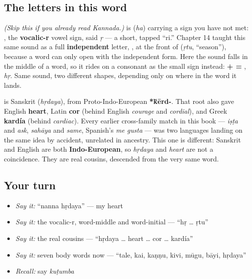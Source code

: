 \subsection*{The letters in this word}
\emph{(Skip this if you already read Kannada.)} \textbf{} is \textbf{} (\emph{ha}) carrying a sign you have not met: \textbf{}, the \textbf{vocalic-r} vowel sign, said \emph{ṛ} — a short, tapped \textquotedblleft{}ri.\textquotedblright{} Chapter 14 taught this same sound as a full \textbf{independent} letter, \textbf{}, at the front of \textbf{} (\emph{ṛtu}, \textquotedblleft{}season\textquotedblright{}), because a word can only open with the independent form. Here the sound falls in the middle of a word, so it rides on a consonant as the small sign \textbf{} instead: \textbf{ +  = }, \emph{hṛ}. Same sound, two different shapes, depending only on where in the word it lands.

\begin{cousinweb}
\textbf{} is Sanskrit \textbf{} (\emph{hṛdaya}), from Proto-Indo-European \textbf{*\'{k}ērd-}. That root also gave English \textbf{heart}, Latin \textbf{cor} (behind English \emph{courage} and \emph{cordial}), and Greek \textbf{kardía} (behind \emph{cardiac}). Every earlier cross-family match in this book — \emph{iṣṭa} and \emph{ask}, \emph{sahāya} and \emph{same}, Spanish's \emph{me gusta} — was two languages landing on the same idea by accident, unrelated in ancestry. This one is different: Sanskrit and English are both \textbf{Indo-European}, so \emph{hṛdaya} and \emph{heart} are not a coincidence. They are real cousins, descended from the very same word.
\end{cousinweb}

\subsection*{Your turn}
\begin{itemize}
\raggedright
  \item \emph{Say it:} \textquotedblleft{}nanna hṛdaya\textquotedblright{} — my heart
  \item \emph{Say it:} the vocalic-r, word-middle and word-initial — \textquotedblleft{}hṛ … ṛtu\textquotedblright{}
  \item \emph{Say it:} the real cousins — \textquotedblleft{}hṛdaya … heart … cor … kardía\textquotedblright{}
  \item \emph{Say it:} seven body words now — \textquotedblleft{}tale, kai, kaṇṇu, kivi, mūgu, bāyi, hṛdaya\textquotedblright{}
  \item \emph{Recall:} say \emph{kuṭumba}
\end{itemize}

